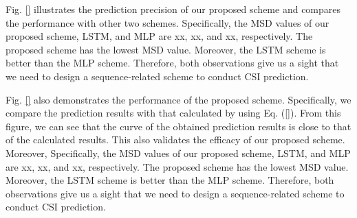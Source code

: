 \documentclass[10pt,journal,cspaper,compsoc]{IEEEtran}
\begin{document}

Fig. \ref{} illustrates the prediction precision of our proposed scheme and compares the performance with other two schemes. Specifically, the MSD values of our proposed scheme, LSTM, and MLP are xx, xx, and xx, respectively. The proposed scheme has the lowest MSD value. Moreover, the LSTM scheme is better than the MLP scheme. Therefore, both observations give us a sight that we need to design a sequence-related scheme to conduct CSI prediction.


Fig. \ref{} also demonstrates the performance of the proposed scheme. Specifically, we compare the prediction results with that calculated by using Eq. (\ref{}). From this figure, we can see that the curve of the obtained prediction results is close to that of the calculated results. This also validates the efficacy of our proposed scheme. Moreover,  Specifically, the MSD values of our proposed scheme, LSTM, and MLP are xx, xx, and xx, respectively. The proposed scheme has the lowest MSD value. Moreover, the LSTM scheme is better than the MLP scheme. Therefore, both observations give us a sight that we need to design a sequence-related scheme to conduct CSI prediction.

\end{document}
